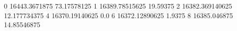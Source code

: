 0 16443.3671875 73.17578125
1 16389.78515625 19.59375
2 16382.369140625 12.177734375
4 16370.19140625 0.0
6 16372.12890625 1.9375
8 16385.046875 14.85546875
